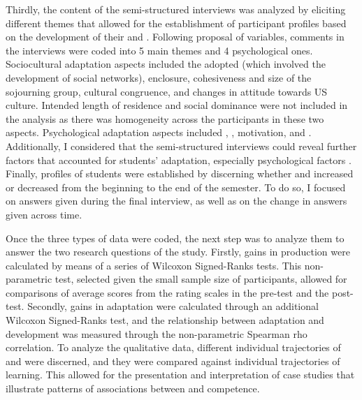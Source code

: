 \documentclass[output=paper]{langsci/langscibook}
\begin{document}
Thirdly, the content of the semi-structured interviews was analyzed by eliciting different themes that allowed for the establishment of participant profiles based on the development of their  and . Following  proposal of  variables, comments in the interviews were coded into 5 main  themes and 4 psychological ones. Sociocultural adaptation aspects included the  adopted (which involved the development of social networks), enclosure, cohesiveness and size of the sojourning group, cultural congruence, and changes in attitude towards US culture. Intended length of residence and social dominance were not included in the analysis as there was homogeneity across the participants in these two aspects. Psychological adaptation aspects included , , motivation, and . Additionally, I considered that the semi-structured interviews could reveal further factors that accounted for students’ adaptation, especially psychological factors \citep{Schumann1986}. Finally,  profiles of students were established by discerning whether  and  increased or decreased from the beginning to the end of the semester. To do so, I focused on answers given during the final interview, as well as on the change in answers given across time.  

Once the three types of data were coded, the next step was to analyze them to answer the two research questions of the study. Firstly, gains in  production were calculated by means of a series of Wilcoxon Signed-Ranks tests. This non-parametric test, selected given the small sample size of participants, allowed for comparisons of average scores from the rating scales in the pre-test and the post-test. Secondly, gains in  adaptation were calculated through an additional Wilcoxon Signed-Ranks test, and the relationship between  adaptation and  development was measured through the non-parametric Spearman rho correlation. To analyze the qualitative data, different individual trajectories of  and  were discerned, and they were compared against individual trajectories of  learning. This allowed for the presentation and interpretation of case studies that illustrate patterns of associations between  and  competence.
\end{document}
